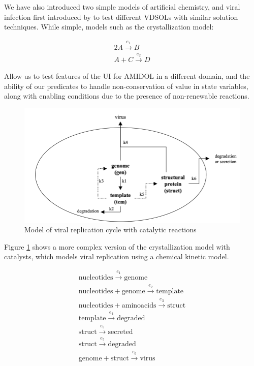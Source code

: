 \documentclass[11pt]{article}
\newcommand{\amidol}{\textsc{AMIDOL}}
\begin{document}
We have also introduced two simple models of artificial chemistry, and viral infection first introduced by \cite{srivastava2002stochastic,haseltine2002approximate} to test different VDSOLs with similar solution techniques.  While simple, models such as the crystallization model:

\begin{eqnarray}
  2A \overset{e_1}{\rightarrow} B\\
  A + C \overset{e_2}{\rightarrow} D
\end{eqnarray}

Allow us to test features of the UI for \amidol{} in a different domain, and the ability of our predicates to handle non-conservation of value in state variables, along with enabling conditions due to the presence of non-renewable reactions.

\begin{figure}
\includegraphics[width=\textwidth]{figs/ViralRep-Crop.png}
\caption{Model of viral replication cycle with catalytic reactions}
\label{Fig:ViralRep}
\end{figure}

Figure \ref{Fig:ViralRep} shows a more complex version of the crystallization model with catalysts, which models viral replication using a chemical kinetic model.

\begin{eqnarray}
\mathrm{nucleotides} \overset{e_1}{\rightarrow} \mathrm{genome}\\
\mathrm{nucleotides} + \mathrm{genome} \overset{e_2}{\rightarrow} \mathrm{template}\\
\mathrm{nucleotides} + \mathrm{aminoacids} \overset{e_3}{\rightarrow} \mathrm{struct}\\
\mathrm{template} \overset{e_4}{\rightarrow} \mathrm{degraded}\\
\mathrm{struct} \overset{e_5}{\rightarrow} \mathrm{secreted}\\
\mathrm{struct} \overset{e_5}{\rightarrow} \mathrm{degraded}\\
\mathrm{genome} + \mathrm{struct} \overset{e_6}{\rightarrow} \mathrm{virus}\\
\end{eqnarray}
\end{document}
